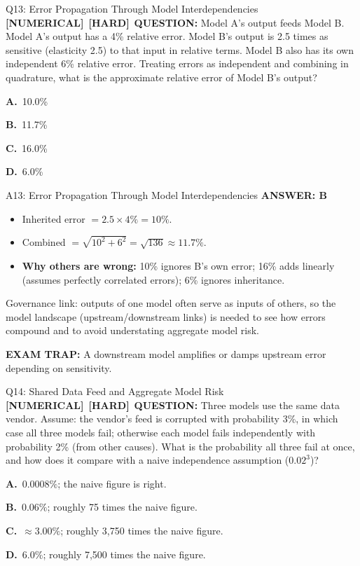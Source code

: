 \documentclass[8pt]{beamer}
\newcommand{\fs}{\fontsize{10}{12}\selectfont}
\newcommand{\opts}[4]{\par\vspace{0.12cm}\noindent\textbf{A.}~#1\par\vspace{0.08cm}\noindent\textbf{B.}~#2\par\vspace{0.08cm}\noindent\textbf{C.}~#3\par\vspace{0.08cm}\noindent\textbf{D.}~#4\par}
\newcommand{\ans}[1]{\textcolor{myblue}{\textbf{ANSWER: #1}}}
\newcommand{\trap}[1]{\textcolor{myred}{\textbf{EXAM TRAP:}} #1}
\newcommand{\numtag}{\textcolor{mypurple}{\textbf{[NUMERICAL]}}}
\newcommand{\hard}{\textcolor{myorange}{\textbf{[HARD]}}}
\begin{document}
\begin{frame}[t]{Q13: Error Propagation Through Model Interdependencies}
\fs
\numtag\ \hard\ \textbf{QUESTION:} Model A's output feeds Model B. Model A's output has a 4\% relative error. Model B's output is 2.5 times as sensitive (elasticity 2.5) to that input in relative terms. Model B also has its own independent 6\% relative error. Treating errors as independent and combining in quadrature, what is the approximate relative error of Model B's output?
\opts{10.0\%}{11.7\%}{16.0\%}{6.0\%}
\end{frame}

\begin{frame}[t]{A13: Error Propagation Through Model Interdependencies}
\fs
\ans{B}
\begin{itemize}
\item Inherited error $=2.5\times4\%=10\%$.
\item Combined $=\sqrt{10^2+6^2}=\sqrt{136}\approx\mathbf{11.7\%}$.
\item \textbf{Why others are wrong:} 10\% ignores B's own error; 16\% adds linearly (assumes perfectly correlated errors); 6\% ignores inheritance.
\end{itemize}
\textcolor{myblue}{Governance link:} outputs of one model often serve as inputs of others, so the model landscape (upstream/downstream links) is needed to see how errors compound and to avoid understating aggregate model risk.

\trap{A downstream model \textcolor{myblue}{amplifies or damps} upstream error depending on sensitivity.}
\end{frame}

\begin{frame}[t]{Q14: Shared Data Feed and Aggregate Model Risk}
\fs
\numtag\ \hard\ \textbf{QUESTION:} Three models use the same data vendor. Assume: the vendor's feed is corrupted with probability 3\%, in which case all three models fail; otherwise each model fails independently with probability 2\% (from other causes). What is the probability all three fail at once, and how does it compare with a naive independence assumption ($0.02^3$)?
\opts{$0.0008\%$; the naive figure is right.}
{$0.06\%$; roughly 75 times the naive figure.}
{$\approx3.00\%$; roughly 3,750 times the naive figure.}
{$6.0\%$; roughly 7,500 times the naive figure.}
\end{frame}
\end{document}
